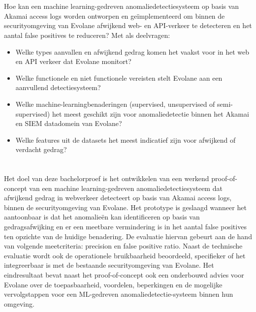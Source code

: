 \section{}%
\label{sec:onderzoeksvraag}

Hoe kan een machine learning-gedreven anomaliedetectiesysteem op basis van Akamai access logs worden ontworpen en geïmplementeerd om binnen de securityomgeving van Evolane afwijkend web- en API-verkeer te detecteren en het aantal false positives te reduceren? 
Met als deelvragen: 

\begin{itemize}
  \item Welke types aanvallen en afwijkend gedrag komen het vaakst voor in het web en API verkeer dat Evolane monitort?
  \item Welke functionele en niet functionele vereisten stelt Evolane aan een aanvullend detectiesysteem? 
  \item Welke machine-learningbenaderingen (supervised, unsupervised of semi-supervised) het meest geschikt zijn voor anomaliedetectie binnen het Akamai en SIEM datadomein van Evolane?
  \item Welke features uit de datasets het meest indicatief zijn voor afwijkend of verdacht gedrag?
\end{itemize}

\section{}%
\label{sec:onderzoeksdoelstelling}

Het doel van deze bachelorproef is het ontwikkelen van een werkend proof-of-concept van een machine learning-gedreven anomaliedetectiesysteem dat afwijkend gedrag in webverkeer detecteert op basis van Akamai access logs, binnen de securityomgeving van Evolane.
Het prototype is geslaagd wanneer het aantoonbaar is dat het anomalieën kan identificeren op basis van gedragsafwijking en er een meetbare vermindering is in het aantal false positives ten opzichte van de huidige benadering. De evaluatie hiervan gebeurt aan de hand van volgende meetcriteria: precision en false positive ratio. Naast de technische evaluatie wordt ook de operationele bruikbaarheid beoordeeld, specifieker of het integreerbaar is met de bestaande securityomgeving van Evolane. 
Het eindresultaat bevat naast het proof-of-concept ook een onderbouwd advies voor Evolane over de toepasbaarheid, voordelen, beperkingen en de mogelijke vervolgstappen voor een ML-gedreven anomaliedetectie-systeem binnen hun omgeving.  

